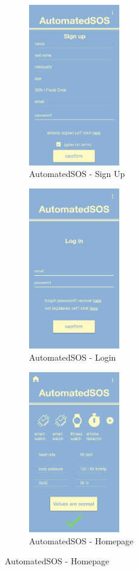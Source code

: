 \begin{figure}[H]
\centering
\begin{subfigure}{.33\textwidth}
  \centering
  \includegraphics[width=.9\linewidth, height = 7cm, keepaspectratio]{./Images/Mockups/AutomatedSOS/ASOS_SignUp.png}
  \caption{AutomatedSOS - Sign Up}
\end{subfigure}%
\begin{subfigure}{.33\textwidth}
  \centering
  \includegraphics[width = .9\linewidth, height = 7cm, keepaspectratio]{./Images/Mockups/AutomatedSOS/ASOS_Login.png}
  \caption{AutomatedSOS - Login}
\end{subfigure}
\begin{subfigure}{.33\textwidth}
  \centering
  \includegraphics[width = .9\linewidth, height = 7cm, keepaspectratio]{./Images/Mockups/AutomatedSOS/ASOS_Homepage.png}
  \caption{AutomatedSOS - Homepage}
\end{subfigure}
\end{figure}



